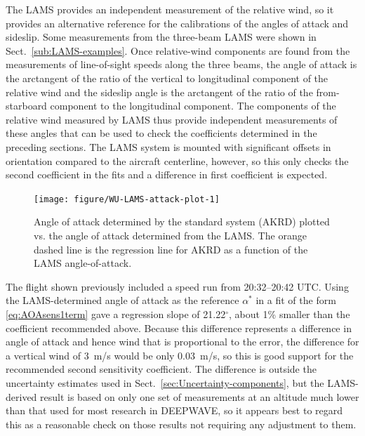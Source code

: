 \documentclass[12pt,twoside,english]{article}\usepackage[]{graphicx}\usepackage[]{color}
\newenvironment{knitrout}{}{} %
\begin{document}
The LAMS provides an independent measurement of the relative wind, so it provides
an alternative reference for the calibrations of the angles of attack and sideslip.
Some measurements from the three-beam LAMS were shown in Sect.~\ref{sub:LAMS-examples}.
Once relative-wind components are found from the measurements of line-of-sight speeds
along the three beams, the angle of attack is the arctangent of the ratio of the 
vertical to longitudinal component of the relative wind and the sideslip angle is
the arctangent of the ratio of the from-starboard component to the longitudinal
component. The components of the relative wind measured by LAMS thus provide 
independent measurements of these angles that can be used to check the coefficients
determined in the preceding sections. The LAMS system is mounted with significant
offsets in orientation compared to the aircraft centerline, however, so this only
checks the second coefficient in the fits and a difference in first coefficient
is expected.






\begin{knitrout}\footnotesize
{}\color{fgcolor}\begin{figure}

{\centering \texttt{[image: figure/WU-LAMS-attack-plot-1]} 

}

\caption[Angle of attack determined by the standard system (AKRD) plotted vs]{Angle of attack determined by the standard system (AKRD) plotted vs. the angle of attack determined from the LAMS. The orange dashed line is the regression line for AKRD as a function of the LAMS angle-of-attack.}\label{fig:LAMS-attack-plot}
\end{figure}


\end{knitrout}

The flight shown previously included a speed run from 20:32--20:42 UTC. Using the LAMS-determined angle of attack as the reference $\alpha^{*}$ in a fit of the form \eqref{eq:AOAsens1term} gave a regression slope of 21.22$^{\circ}$, 
about 1\% smaller than the
coefficient recommended above. Because this difference represents a difference in
angle of attack and hence wind that is proportional to the error, the difference for
a vertical wind of 3~m/s would be only 0.03~m/s, so this is good support for the
recommended second sensitivity coefficient. The difference is outside the uncertainty
estimates used in Sect.~\ref{sec:Uncertainty-components}, but the LAMS-derived result is based
on only one set of measurements at an altitude much lower than that used for most
research in DEEPWAVE, so it appears best to regard this as a reasonable check on
those results not requiring any adjustment to them.
\end{document}

